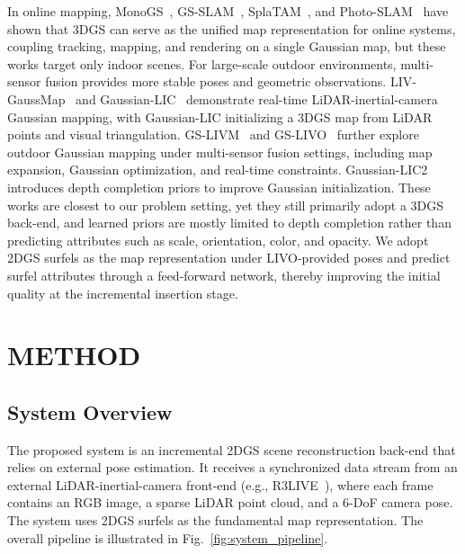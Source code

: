 \documentclass[letterpaper,journal]{IEEEtran}
\begin{document}
In online mapping, MonoGS~\cite{matsuki2024gaussian}, GS-SLAM~\cite{yan2024gs}, SplaTAM~\cite{keetha2024splatam}, and Photo-SLAM~\cite{huang2024photo} have shown that 3DGS can serve as the unified map representation for online systems, coupling tracking, mapping, and rendering on a single Gaussian map, but these works target only indoor scenes. For large-scale outdoor environments, multi-sensor fusion provides more stable poses and geometric observations. LIV-GaussMap~\cite{hong2024liv} and Gaussian-LIC~\cite{lang2024gaussian} demonstrate real-time LiDAR-inertial-camera Gaussian mapping, with Gaussian-LIC initializing a 3DGS map from LiDAR points and visual triangulation. GS-LIVM~\cite{xie2024gs} and GS-LIVO~\cite{hong2025gs} further explore outdoor Gaussian mapping under multi-sensor fusion settings, including map expansion, Gaussian optimization, and real-time constraints. Gaussian-LIC2~\cite{lang2025gaussianlic2} introduces depth completion priors to improve Gaussian initialization. These works are closest to our problem setting, yet they still primarily adopt a 3DGS back-end, and learned priors are mostly limited to depth completion rather than predicting attributes such as scale, orientation, color, and opacity. We adopt 2DGS surfels as the map representation under LIVO-provided poses and predict surfel attributes through a feed-forward network, thereby improving the initial quality at the incremental insertion stage.


\section{METHOD}

\subsection{System Overview}

The proposed system is an incremental 2DGS scene reconstruction back-end that relies on external pose estimation. It receives a synchronized data stream from an external LiDAR-inertial-camera front-end (e.g., R3LIVE~\cite{lin2022r}), where each frame contains an RGB image, a sparse LiDAR point cloud, and a 6-DoF camera pose. The system uses 2DGS surfels as the fundamental map representation. The overall pipeline is illustrated in Fig.~\ref{fig:system_pipeline}.
\end{document}
